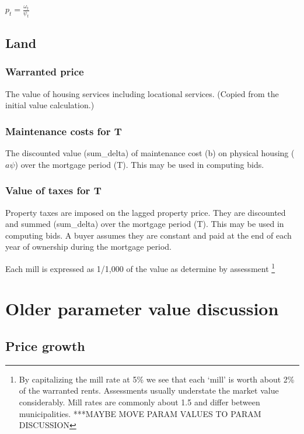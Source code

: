 $p_t= \frac{\omega_t}{\psi_t}$ 


\subsection{Land}
\subsubsection{Warranted price} The value of housing services including locational services. (Copied from the initial value calculation.)

\subsubsection{Maintenance costs for T} The discounted value (sum\_delta) of maintenance cost (b) on  physical housing ($a\psi$) over the mortgage period (T). This may be used in computing bids.

\subsubsection{Value of taxes for T}
Property taxes are imposed on the  lagged property price. They  are discounted and summed (sum\_delta)  over the mortgage period (T). This may be used in computing bids. A buyer assumes they are constant and paid at the end of each year of ownership during the mortgage period.

Each mill is expressed as  1/1,000 of the value as determine by assessment \footnote{By capitalizing the mill rate at 5\%  we see that each `mill' is worth about 2\% of the warranted rents. Assessments usually understate the market value considerably. Mill rates are commonly about 1.5 and differ between municipalities. ***MAYBE MOVE PARAM VALUES TO PARAM DISCUSSION}

\section{Older parameter value discussion}

\subsection{Price growth}


